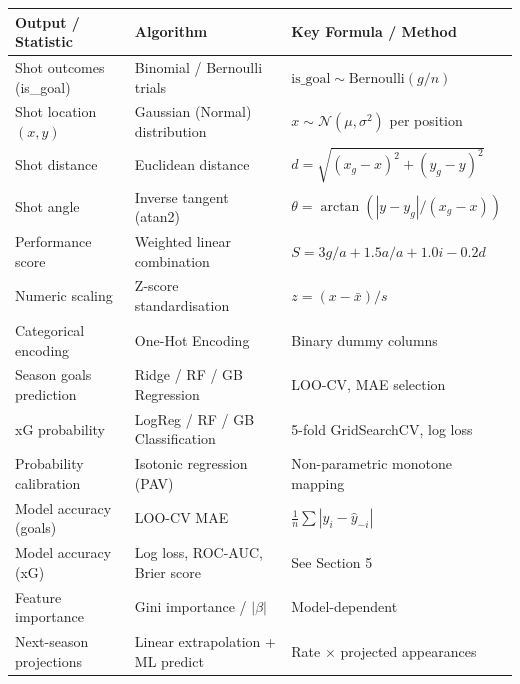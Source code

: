 \documentclass[11pt,a4paper]{article}
\begin{document}
\begin{longtable}{>{\raggedright}p{4.5cm} p{4.5cm} p{5.5cm}}
  \toprule
  \textbf{Output / Statistic} & \textbf{Algorithm} & \textbf{Key Formula / Method} \\
  \midrule
  \endhead

  Shot outcomes (is\_goal) &
    Binomial / Bernoulli trials &
    $\text{is\_goal} \sim \text{Bernoulli}(g/n)$ \\[4pt]

  Shot location $(x, y)$ &
    Gaussian (Normal) distribution &
    $x \sim \mathcal{N}(\mu, \sigma^2)$ per position \\[4pt]

  Shot distance &
    Euclidean distance &
    $d = \sqrt{(x_g - x)^2 + (y_g - y)^2}$ \\[4pt]

  Shot angle &
    Inverse tangent (atan2) &
    $\theta = \arctan(|y - y_g| / (x_g - x))$ \\[4pt]

  Performance score &
    Weighted linear combination &
    $S = 3g/a + 1.5a/a + 1.0i - 0.2d$ \\[4pt]

  Numeric scaling &
    Z-score standardisation &
    $z = (x - \bar{x}) / s$ \\[4pt]

  Categorical encoding &
    One-Hot Encoding &
    Binary dummy columns \\[4pt]

  Season goals prediction &
    Ridge / RF / GB Regression &
    LOO-CV, MAE selection \\[4pt]

  xG probability &
    LogReg / RF / GB Classification &
    5-fold GridSearchCV, log loss \\[4pt]

  Probability calibration &
    Isotonic regression (PAV) &
    Non-parametric monotone mapping \\[4pt]

  Model accuracy (goals) &
    LOO-CV MAE &
    $\frac{1}{n}\sum|y_i - \hat{y}_{-i}|$ \\[4pt]

  Model accuracy (xG) &
    Log loss, ROC-AUC, Brier score &
    See Section 5 \\[4pt]

  Feature importance &
    Gini importance / $|\beta|$ &
    Model-dependent \\[4pt]

  Next-season projections &
    Linear extrapolation + ML predict &
    Rate $\times$ projected appearances \\

  \bottomrule
\end{longtable}
\end{document}
